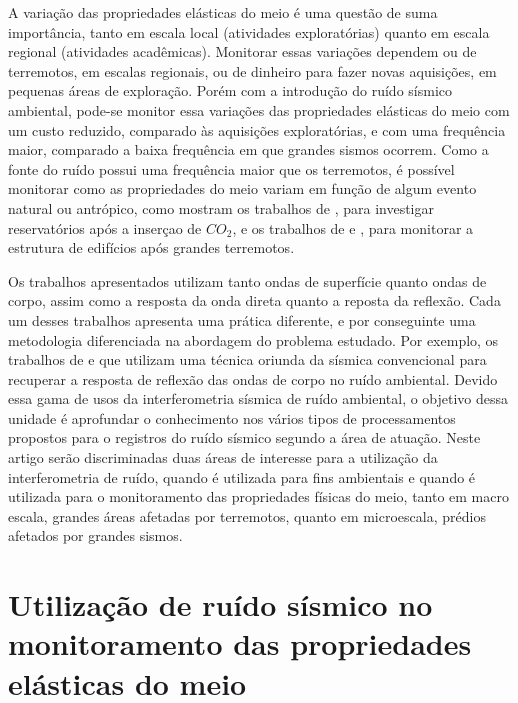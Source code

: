 \documentclass[paper,twocolumn]{geophysics}
\begin{document}
A variação das propriedades elásticas do meio é uma questão de suma importância, tanto em escala local (atividades exploratórias) quanto em escala regional (atividades acadêmicas). Monitorar essas variações dependem ou de terremotos, em escalas regionais, ou de dinheiro para fazer novas aquisições, em pequenas áreas de exploração. Porém com a introdução do ruído sísmico ambiental, pode-se monitor essa variações das propriedades elásticas do meio com um custo reduzido, comparado às aquisições exploratórias, e com uma frequência maior, comparado a baixa frequência em que grandes sismos ocorrem. Como a fonte do ruído possui uma frequência maior que os terremotos, é possível monitorar como as propriedades do meio variam em função de algum evento natural ou antrópico, como mostram os trabalhos de \cite{boullenger_studying_2015}, para investigar reservatórios após a inserçao de $CO_{2}$, e os trabalhos de \cite{prieto_impulse_2010} e \cite{nakata_damage_2015}, para monitorar a estrutura de edifícios após grandes terremotos.

Os trabalhos apresentados utilizam tanto ondas de superfície quanto ondas de corpo, assim como a resposta da onda direta quanto a reposta da reflexão. Cada um desses trabalhos apresenta uma prática diferente, e por conseguinte uma metodologia  diferenciada na abordagem do problema estudado. Por exemplo, os trabalhos de \cite{vidal_retrieval_2014} e \cite{boullenger_studying_2015} que utilizam uma técnica oriunda da sísmica convencional para recuperar a resposta de reflexão das ondas de corpo no ruído ambiental. Devido essa gama de usos da interferometria sísmica de ruído ambiental, o objetivo dessa unidade é aprofundar o conhecimento nos vários tipos de processamentos propostos para o registros do ruído sísmico segundo a área de atuação. Neste artigo serão discriminadas duas áreas de interesse para a utilização da interferometria de ruído, quando é utilizada para fins ambientais e quando  é utilizada para o monitoramento das propriedades físicas do meio, tanto em macro escala, grandes áreas afetadas por terremotos, quanto em microescala, prédios afetados por grandes sismos.

\section*{Utilização de ruído sísmico no monitoramento das propriedades elásticas do meio}
\end{document}
